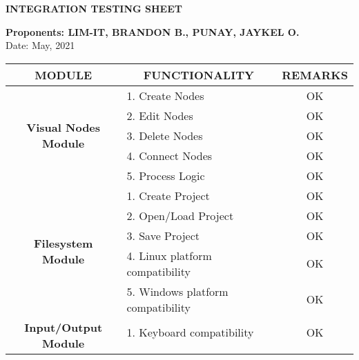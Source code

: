\clearpage
{}
\textbf{INTEGRATION TESTING SHEET}
\leavevmode\\
\begin{flushleft}
	\textbf{Proponents: LIM-IT, BRANDON B., PUNAY, JAYKEL O.}
	\leavevmode\\
	Date: May, 2021
\end{flushleft}

\begin{longtable}[c]{|c|l|c|}
\hline
\textbf{MODULE}                               & \multicolumn{1}{c|}{\textbf{FUNCTIONALITY}} & \textbf{REMARKS} \\ \hline
\endfirsthead
%
\endhead
%
\multirow{5}{*}{\textbf{Visual Nodes Module}} & 1. Create Nodes                             & OK               \\ \cline{2-3} 
                                              & 2. Edit Nodes                               & OK               \\ \cline{2-3} 
                                              & 3. Delete Nodes                             & OK               \\ \cline{2-3} 
                                              & 4. Connect Nodes                            & OK               \\ \cline{2-3} 
                                              & 5. Process Logic                            & OK               \\ \hline
\multirow{5}{*}{\textbf{Filesystem Module}}   & 1. Create Project                           & OK               \\ \cline{2-3} 
                                              & 2. Open/Load Project                        & OK               \\ \cline{2-3} 
                                              & 3. Save Project                             & OK               \\ \cline{2-3} 
                                              & 4. Linux platform compatibility             & OK               \\ \cline{2-3} 
                                              & 5. Windows platform compatibility           & OK               \\ \hline
\multirow{4}{*}{\textbf{Input/Output Module}} & 1. Keyboard compatibility                   & OK               \\ \cline{2-3} 

\end{longtable}
